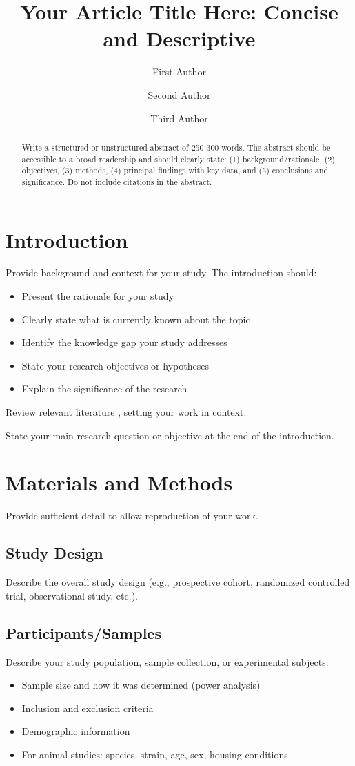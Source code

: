 \documentclass[10pt,letterpaper]{article}
\title{Your Article Title Here: Concise and Descriptive}
\author[1]{First Author}
\author[1,2]{Second Author}
\author[2,$\dagger$]{Third Author}
\affil[1]{Department of Biology, University Name, City, State, Country}
\affil[2]{Institute of Research, Institution Name, City, Country}
\affil[$\dagger$]{Corresponding author. E-mail: [email protected]}
\date{}
\begin{document}
\maketitle

\begin{abstract}
\noindent
Write a structured or unstructured abstract of 250-300 words. The abstract should be accessible to a broad readership and should clearly state: (1) background/rationale, (2) objectives, (3) methods, (4) principal findings with key data, and (5) conclusions and significance. Do not include citations in the abstract.
\end{abstract}

\section*{Introduction}

Provide background and context for your study. The introduction should:
\begin{itemize}
    \item Present the rationale for your study
    \item Clearly state what is currently known about the topic
    \item Identify the knowledge gap your study addresses
    \item State your research objectives or hypotheses
    \item Explain the significance of the research
\end{itemize}

Review relevant literature \cite{smith2023,jones2022}, setting your work in context.

State your main research question or objective at the end of the introduction.

\section*{Materials and Methods}

Provide sufficient detail to allow reproduction of your work.

\subsection*{Study Design}
Describe the overall study design (e.g., prospective cohort, randomized controlled trial, observational study, etc.).

\subsection*{Participants/Samples}
Describe your study population, sample collection, or experimental subjects:
\begin{itemize}
    \item Sample size and how it was determined (power analysis)
    \item Inclusion and exclusion criteria
    \item Demographic information
    \item For animal studies: species, strain, age, sex, housing conditions
\end{itemize}
\end{document}

